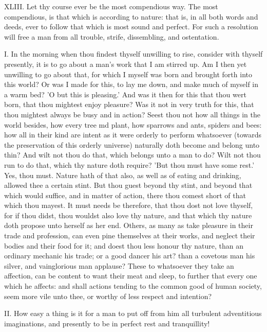 XLIII. Let thy course ever be the most compendious way. The most
compendious, is that which is according to nature: that is, in all both
words and deeds, ever to follow that which is most sound and perfect. For
such a resolution will free a man from all trouble, strife, dissembling,
and ostentation.


I. In the morning when thou findest thyself unwilling to rise, consider
with thyself presently, it is to go about a man's work that I am stirred
up. Am I then yet unwilling to go about that, for which I myself was born
and brought forth into this world? Or was I made for this, to lay me down,
and make much of myself in a warm bed? 'O but this is pleasing.' And was
it then for this that thou wert born, that thou mightest enjoy pleasure?
Was it not in very truth for this, that thou mightest always be busy and
in action? Seest thou not how all things in the world besides, how every
tree md plant, how sparrows and ants, spiders and bees: how all in their
kind are intent as it were orderly to perform whatsoever (towards the
preservation of this orderly universe) naturally doth become and belong
unto thin? And wilt not thou do that, which belongs unto a man to do? Wilt
not thou run to do that, which thy nature doth require? 'But thou must
have some rest.' Yes, thou must. Nature hath of that also, as well as of
eating and drinking, allowed thee a certain stint. But thou guest beyond
thy stint, and beyond that which would suffice, and in matter of action,
there thou comest short of that which thou mayest. It must needs be
therefore, that thou dost not love thyself, for if thou didst, thou
wouldst also love thy nature, and that which thy nature doth propose unto
herself as her end. Others, as many as take pleasure in their trade and
profession, can even pine themselves at their works, and neglect their
bodies and their food for it; and doest thou less honour thy nature, than
an ordinary mechanic his trade; or a good dancer his art? than a covetous
man his silver, and vainglorious man applause? These to whatsoever they
take an affection, can be content to want their meat and sleep, to further
that every one which he affects: and shall actions tending to the common
good of human society, seem more vile unto thee, or worthy of less respect
and intention?

II. How easy a thing is it for a man to put off from him all turbulent
adventitious imaginations, and presently to be in perfect rest and
tranquillity!

